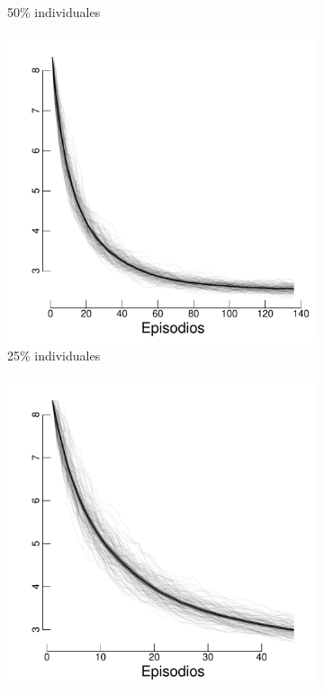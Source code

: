 \documentclass[a4paper,11pt]{book}
\theoremstyle{definition}
\begin{document}
\begin{figure}[H]
\begin{subfigure}[t]{0.32\textwidth}
  \caption{\scriptsize 50\% individuales}\label{H1_mu}
  \end{subfigure}
  \begin{subfigure}[t]{0.32\textwidth}
  \includegraphics[page=3,width=\textwidth]{static/truesynergy/expH3.pdf}
  \caption{\scriptsize 25\% individuales}\label{H3_mu}
  \end{subfigure}
  \begin{subfigure}[t]{0.32\textwidth}
  \includegraphics[page=2,width=\textwidth]{static/truesynergy/expH4.pdf}

\end{subfigure}
\end{figure}
\end{document}
